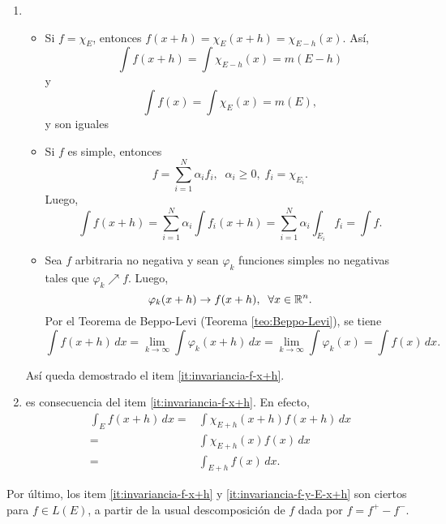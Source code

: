                     \begin{demo}
                    \begin{enumerate}
                        \item 
                    \begin{itemize}
                        \item Si $f=\chi_E$, entonces 
                        $f(x+h)=\chi_E (x+h) =\chi_{E-h}(x).$
                        As\'i, 
                        \[
                        \int f(x+h)= \int \chi_{E-h} (x) =m(E-h)
                        \]
                        y 
                        \[
                        \int f(x) = \int \chi_E(x)=m(E),
                        \]
                        y son iguales
                        \item Si $f$ es simple, entonces 
                        \[  f=\sum\limits_{i=1}^N \alpha_i f_i, \;\; \alpha_i\geq 0,\;f_i=\chi_{E_i}.
                        \]
                        Luego, 
                        \[
                        \int f(x+h) =\sum\limits_{i=1}^N \alpha_i \int f_i(x+h)=
                        \sum\limits_{i=1}^N \alpha_i \int_{E_i} f_i= \int f.
                        \]
                        \item Sea $f$ arbitraria no negativa y sean $\varphi_k$ funciones simples no negativas tales que $\varphi_k \nearrow f$. Luego, 
                        \[
                        \varphi_k(x+h)\to f(x+h), \;\;\forall x \in \mathbb{R}^n.
                        \]
                        Por el Teorema de Beppo-Levi (Teorema \ref{teo:Beppo-Levi}), se tiene
                        \[
                        \int f(x+h)\,dx=\lim\limits_{k \to \infty} \int \varphi_k(x+h)\,dx=
                        \lim\limits_{k\to \infty} \int \varphi_k(x) =\int f(x)\,dx.
                        \]
                    \end{itemize}
                    As\'i queda demostrado el item \ref{it:invariancia-f-x+h}.
                    \item es consecuencia del item \ref{it:invariancia-f-x+h}. En efecto, 
                    \[\begin{split} 
                    \int_E f(x+h) \,dx=& \int \chi_{E+h}(x+h) f(x+h) \,dx
                    \\
                    =&
                    \int \chi_{E+h} (x) f(x)\,dx 
                    \\
                    =&
                    \int_{E+h} f(x)\,dx.
                    \end{split}\]
                    \end{enumerate}
                    Por \'ultimo, los item \ref{it:invariancia-f-x+h} y   \ref{it:invariancia-f-y-E-x+h} son ciertos para $f\in L(E)$,  a partir de la usual descomposici\'on de $f$ dada por $f=f^{+}-f^{-}$.
                    \end{demo}
                    
